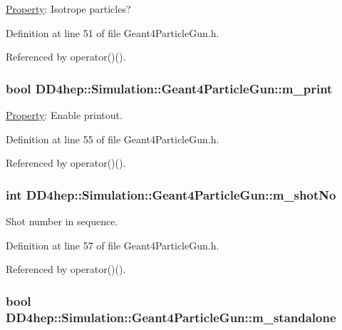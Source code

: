 \hyperlink{class_d_d4hep_1_1_property}{Property}: Isotrope particles? 

Definition at line 51 of file Geant4ParticleGun.h.

Referenced by operator()().\hypertarget{class_d_d4hep_1_1_simulation_1_1_geant4_particle_gun_ac7ffd1d0ae00fc56978aef5cf7ec6b83}{
\subsubsection[{m\_\-print}]{\setlength{\rightskip}{0pt plus 5cm}bool {\bf DD4hep::Simulation::Geant4ParticleGun::m\_\-print}}}
\label{class_d_d4hep_1_1_simulation_1_1_geant4_particle_gun_ac7ffd1d0ae00fc56978aef5cf7ec6b83}


\hyperlink{class_d_d4hep_1_1_property}{Property}: Enable printout. 

Definition at line 55 of file Geant4ParticleGun.h.

Referenced by operator()().\hypertarget{class_d_d4hep_1_1_simulation_1_1_geant4_particle_gun_a385166af11357b6ec06b835b4ee8cca6}{
\subsubsection[{m\_\-shotNo}]{\setlength{\rightskip}{0pt plus 5cm}int {\bf DD4hep::Simulation::Geant4ParticleGun::m\_\-shotNo}}}
\label{class_d_d4hep_1_1_simulation_1_1_geant4_particle_gun_a385166af11357b6ec06b835b4ee8cca6}


Shot number in sequence. 

Definition at line 57 of file Geant4ParticleGun.h.

Referenced by operator()().\hypertarget{class_d_d4hep_1_1_simulation_1_1_geant4_particle_gun_af845ef9f13542031af0bf41b53a9f462}{
\subsubsection[{m\_\-standalone}]{\setlength{\rightskip}{0pt plus 5cm}bool {\bf DD4hep::Simulation::Geant4ParticleGun::m\_\-standalone}}}
\label{class_d_d4hep_1_1_simulation_1_1_geant4_particle_gun_af845ef9f13542031af0bf41b53a9f462}


